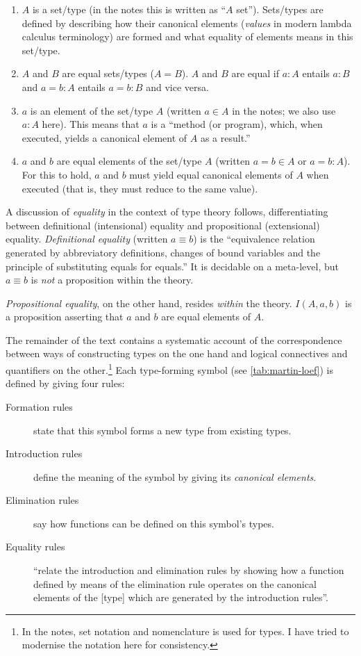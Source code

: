 \documentclass[12pt,toc=bibliography,numbers=noendperiod,
               footnotes=multiple,twoside]{scrartcl}
\begin{document}
\begin{enumerate}
\item \(A\) is a set/type (in the notes this is written as \enquote{\(A\) set}). Sets/types are defined by describing how their canonical elements (\emph{values} in modern lambda calculus terminology) are formed and what equality of elements means in this set/type.
\item \(A\) and \(B\) are equal sets/types (\(A = B\)). \(A\) and \(B\) are equal if \(a : A\) entails \(a : B\) and \(a = b : A\) entails \(a = b : B\) and vice versa.
\item \(a\) is an element of the set/type \(A\) (written \(a \in A\) in the notes; we also use \(a : A\) here). This means that \(a\) is a \enquote{method (or program), which, when executed, yields a canonical element of \(A\) as a result.}
\item \(a\) and \(b\) are equal elements of the set/type \(A\) (written \(a = b \in A\) or \(a = b : A\)). For this to hold, \(a\) and \(b\) must yield equal canonical elements of \(A\) when executed (that is, they must reduce to the same value).
\end{enumerate}

A discussion of \emph{equality} in the context of type theory follows, differentiating between definitional (intensional) equality and propositional (extensional) equality. \emph{Definitional equality} (written \(a \equiv b\)) is the \enquote{equivalence relation generated by abbreviatory definitions, changes of bound variables and the principle of substituting equals for equals.} It is decidable on a meta-level, but \(a \equiv b\) is \emph{not} a proposition within the theory.

\emph{Propositional equality}, on the other hand, resides \emph{within} the theory. \(I(A, a, b)\) is a proposition asserting that \(a\) and \(b\) are equal elements of \(A\).

The remainder of the text contains a systematic account of the correspondence between ways of constructing types on the one hand and logical connectives and quantifiers on the other.\footnote{In the notes, set notation and nomenclature is used for types. I have tried to modernise the notation here for consistency.} Each type-forming symbol (see \cref{tab:martin-loef}) is defined by giving four rules:

\begin{description}
\item[Formation rules] state that this symbol forms a new type from existing types.
\item[Introduction rules] define the meaning of the symbol by giving its \emph{canonical elements}.
\item[Elimination rules] say how functions can be defined on this symbol's types.
\item[Equality rules] \enquote{relate the introduction and elimination rules by showing how a function defined by means of the elimination rule operates on the canonical elements of the [type] which are generated by the introduction rules}.
\end{description}
\end{document}
